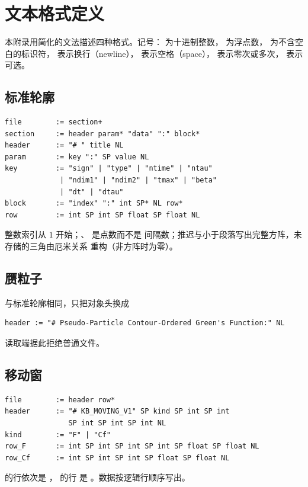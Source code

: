 \chapter{文本格式定义}
\label{app:formats}

本附录用简化的文法描述四种格式。记号： 为十进制整数，
 为浮点数， 为不含空白的标识符，
 表示换行（newline）， 表示空格（space），
\code{*} 表示零次或多次，\code{[...]} 表示可选。

\section{标准轮廓}
\begin{lstlisting}[numbers=none,language=plaintext]
file        := section+
section     := header param* "data" ":" block*
header      := "# " title NL
param       := key ":" SP value NL
key         := "sign" | "type" | "ntime" | "ntau"
             | "ndim1" | "ndim2" | "tmax" | "beta"
             | "dt" | "dtau"
block       := "index" ":" int SP* NL row*
row         := int SP int SP float SP float NL
\end{lstlisting}
整数索引从 $1$ 开始；、 是点数而不是
间隔数；推迟与小于段落写出完整方阵，未存储的三角由厄米关系
重构（非方阵时为零）。

\section{赝粒子}
与标准轮廓相同，只把对象头换成
\begin{lstlisting}[numbers=none,language=plaintext]
header := "# Pseudo-Particle Contour-Ordered Green's Function:" NL
\end{lstlisting}
读取端据此拒绝普通文件。

\section{移动窗}
\begin{lstlisting}[numbers=none,language=plaintext]
file        := header row*
header      := "# KB_MOVING_V1" SP kind SP int SP int
               SP int SP int SP int NL
kind        := "F" | "Cf"
row_F       := int SP int SP int SP int SP float SP float NL
row_Cf      := int SP int SP int SP float SP float NL
\end{lstlisting}
 的行依次是 ， 的行
是 。数据按逻辑行顺序写出。

